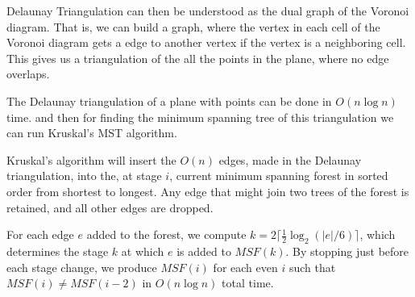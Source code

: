 Delaunay Triangulation can then be understood as the dual graph of the Voronoi diagram. That is, we can 
build a graph, where the vertex in each cell of the Voronoi diagram gets a edge to another vertex if the 
vertex is a neighboring cell. This gives us a triangulation of the all the points in the plane, where no 
edge overlaps.

The Delaunay triangulation of a plane with points can be done in $O(n \log n)$ time\cite{CompGeo}. and 
then for finding the minimum spanning tree of this triangulation we can run Kruskal's MST 
algorithm\cite{IntroToAlg}. 

Kruskal's algorithm will insert the $O(n)$ edges, made in the Delaunay triangulation, into the, at 
stage $i$, current minimum spanning forest in sorted order from shortest to longest. Any edge that 
might join two trees of the forest is retained, and all other edges are dropped. 

For each edge $e$ added to the forest, we compute $k = 2 \lceil \frac{1}{2} \log_2 (|e|/6) \rceil$, 
which determines the stage $k$ at which $e$ is added to $MSF(k)$. By stopping 
just before each stage change, we produce $MSF(i)$ for each even $i$ such that $MSF(i) \neq MSF(i-2)$ 
in $O(n \log n)$ total time.  

